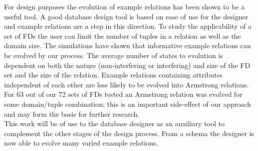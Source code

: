 For design purposes the evolution of example relations has been shown to
be a useful tool.  A good database
design tool is based on ease of use for the designer and example relations
are a step in this direction.  To  study the applicability of a set of FDs
 the user can limit the number of tuples in
a relation as well as the domain size. The simulations have shown that 
informative example relations can be evolved by our process.  The 
average number of states to evolution is dependent on both
the nature (non-interfering or interfering) and size of the FD set and the size of the relation.
Example relations containing attributes independent of each other
are less likely to be evolved into Armstrong relations. For 63 out
of our 72 sets of FDs tested an Armstrong relation was evolved
for some domain/tuple combination; this is an important side-effect
of our approach and may form the basis for further research.\\

This work
will be of use to the database designer as an auxiliary tool to complement
the other stages of the design process.  From a schema the designer is now
 able to evolve many varied example relations.\\

